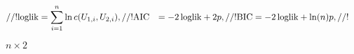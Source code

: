 \documentclass{article}
\begin{document}
\begin{align*} //! \mathrm{loglik} &= \sum_{i = 1}^n \ln c(U_{1, i}, U_{2, i}), \newline //! \mathrm{AIC} &= -2\, \mathrm{loglik} + 2 p, \newline //! \mathrm{BIC} &= -2\, \mathrm{loglik} + \ln(n) p, //! \end{align*}
\pagebreak

$n \times 2$
\pagebreak
\end{document}

